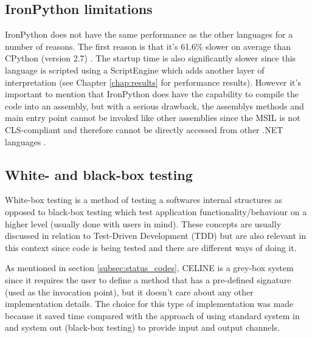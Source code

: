 \subsection{IronPython limitations} \label{subsec:ironpython_limitations}
IronPython does not have the same performance as the other languages for a number of reasons. The first reason is that it's 61.6\% slower on average than CPython (version 2.7) \cite{IronPythonPerformance}. The startup time is also significantly slower since this language is scripted using a ScriptEngine which adds another layer of interpretation (see Chapter \ref{chap:results} for performance results). However it's important to mention that IronPython does have the capability to compile the code into an assembly, but with a serious drawback, the assemblys methods and main entry point cannot be invoked like other assemblies since the MSIL is not CLS-compliant \cite{CLSCompliant} and therefore cannot be directly accessed from other .NET languages \cite{AccessingPythonCode}. 


\subsection{White- and black-box testing} \label{subsec:whitebox_blackbox}
White-box testing is a method of testing a softwares internal structures as opposed to black-box testing which test application functionality/behaviour on a higher level (usually done with users in mind). These concepts are usually discussed in relation to Test-Driven Development (TDD) but are also relevant in this context since code is being tested and there are different ways of doing it.  

As mentioned in section \ref{subsec:status_codes}, CELINE is a grey-box system since it requires the user to define a method that has a pre-defined signature (used as the invocation point), but it doesn't care about any other implementation details. The choice for this type of implementation was made because it saved time compared with the approach of using standard system in and system out (black-box testing) to provide input and output channels. 


